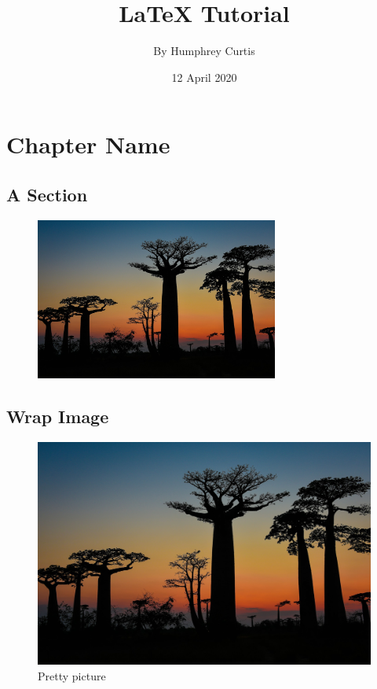 \documentclass[a4paper,12pt]{book}
\begin{document}
\title{\Large{\textbf{LaTeX Tutorial}}}
\author{By Humphrey Curtis}
\date{12 April 2020}

\maketitle 
\let\cleardoublepage\clearpage
\tableofcontents 

\setcounter{page}{2}

\chapter{Chapter Name}

\blindmathtrue
\blindtext[5]

\section{A Section}
\blindtext
\begin{figure}[ht]
\centering 

\includegraphics[width=8cm]{pic.png}
\end{figure}
\blindtext
\newpage

\section*{Wrap Image}
\begingroup
\setlength{\intextsep}{0pt}
\setlength{\columnsep}{15pt}

\begin{figure}
\centering
\includegraphics[width=\linewidth]{pic.png}
\caption{Pretty picture}\label{fig:prettypic}
\end{figure}
\end{document}
